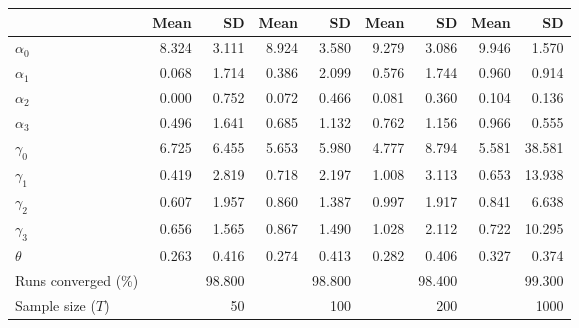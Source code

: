 
\begin{tabular}[t]{lrrrrrrrr}
\toprule
  & Mean & SD & Mean  & SD  & Mean   & SD   & Mean    & SD   \\
\midrule
$\alpha_{0}$ & 8.324 & 3.111 & 8.924 & 3.580 & 9.279 & 3.086 & 9.946 & 1.570\\
$\alpha_{1}$ & 0.068 & 1.714 & 0.386 & 2.099 & 0.576 & 1.744 & 0.960 & 0.914\\
$\alpha_{2}$ & 0.000 & 0.752 & 0.072 & 0.466 & 0.081 & 0.360 & 0.104 & 0.136\\
$\alpha_{3}$ & 0.496 & 1.641 & 0.685 & 1.132 & 0.762 & 1.156 & 0.966 & 0.555\\
$\gamma_{0}$ & 6.725 & 6.455 & 5.653 & 5.980 & 4.777 & 8.794 & 5.581 & 38.581\\
$\gamma_{1}$ & 0.419 & 2.819 & 0.718 & 2.197 & 1.008 & 3.113 & 0.653 & 13.938\\
$\gamma_{2}$ & 0.607 & 1.957 & 0.860 & 1.387 & 0.997 & 1.917 & 0.841 & 6.638\\
$\gamma_{3}$ & 0.656 & 1.565 & 0.867 & 1.490 & 1.028 & 2.112 & 0.722 & 10.295\\
$\theta$ & 0.263 & 0.416 & 0.274 & 0.413 & 0.282 & 0.406 & 0.327 & 0.374\\
Runs converged (\%) &  & 98.800 &  & 98.800 &  & 98.400 &  & 99.300\\
Sample size ($T$) &  & 50 &  & 100 &  & 200 &  & 1000\\
\bottomrule
\end{tabular}
